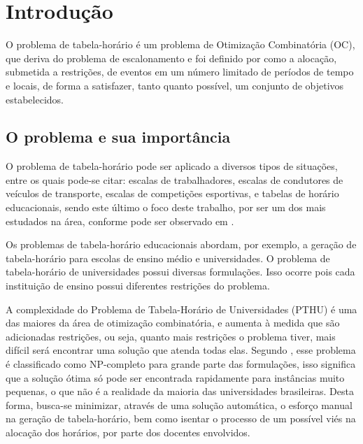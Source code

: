 \chapter{Introdução}
\label{sec-intro}



O problema de tabela-horário é um problema de Otimização Combinatória (OC), que deriva do problema de escalonamento e foi definido por  como a alocação, submetida a restrições, de eventos em um número limitado de períodos de tempo e locais, de forma a satisfazer, tanto quanto possível, um conjunto de objetivos estabelecidos.

\section{O problema e sua importância}
\label{sec-intro-problema}

O problema de tabela-horário pode ser aplicado a diversos tipos de situações, entre os quais pode-se citar: escalas de trabalhadores, escalas de condutores de veículos de transporte, escalas de competições esportivas, e tabelas de horário educacionais, sendo este último o foco deste trabalho, por ser um dos mais estudados na área, conforme pode ser observado em .

Os problemas de tabela-horário educacionais abordam, por exemplo, a geração de tabela-horário para escolas de ensino médio e universidades. O problema de tabela-horário de universidades possui diversas formulações. Isso ocorre pois cada instituição de ensino possui diferentes restrições do problema.

A complexidade do Problema de Tabela-Horário de Universidades (PTHU) é uma das maiores da área de otimização combinatória, e aumenta à medida que são adicionadas restrições, ou seja, quanto mais restrições o problema tiver, mais difícil será encontrar uma solução que atenda todas elas. Segundo , esse problema é classificado como NP-completo para grande parte das formulações, isso significa que a solução ótima só pode ser encontrada rapidamente para instâncias muito pequenas, o que não é a realidade da maioria das universidades brasileiras. Desta forma, busca-se minimizar, através de uma solução automática, o esforço manual na geração de tabela-horário, bem como isentar o processo de um possível viés na alocação dos horários, por parte dos docentes envolvidos.

